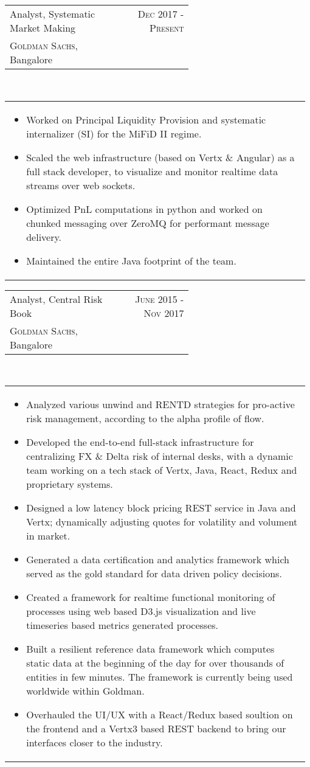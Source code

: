 \documentclass[a4paper]{article} %
\newcommand{\verticalspacing}{-0.25cm}
\newcommand{\bulletspace}{0.7cm}
\newcommand{\projectheadspacing}{6.9cm}
\newcommand{\cproject}[5]{%
    \begin{tabular}{p{0.60\linewidth}r}
        \textcolor{NavyBlue}{\small #2} & \multicolumn{1}{m{ \projectheadspacing{} }}{\raggedleft \small {\textsc{#1}}}\\
        \small {#3} & \small {#4}
    \end{tabular}\\
    \begin{tabular}{p{0.98\linewidth}}
    \vspace{-0.3cm}
        \small{#5}
    \end{tabular}
    \vspace{\verticalspacing{}}
}
\begin{document}
\cproject
      {Dec 2017 - Present}
      {Analyst, Systematic Market Making}
      {\textsc{Goldman Sachs}, Bangalore}
      {}
      {%
        \begin{itemize}[leftmargin=\bulletspace{}]
          \item Worked on Principal Liquidity Provision and systematic internalizer (SI) for the MiFiD II regime.
          \item Scaled the web infrastructure (based on Vertx \& Angular) as a full stack developer, to visualize
                and monitor realtime data streams over web sockets.
          \item Optimized PnL computations in python and worked on chunked messaging over ZeroMQ for performant
                message delivery.
          \item Maintained the entire Java footprint of the team.
        \end{itemize}
      }

\cproject
      {June 2015 - Nov 2017}
      {Analyst, Central Risk Book}
      {\textsc{Goldman Sachs}, Bangalore}
      {}
      {%
        \begin{itemize}[leftmargin=\bulletspace{}]
          \item Analyzed various unwind and RENTD strategies for pro-active risk management, according
                to the alpha profile of flow.
          \item Developed the end-to-end full-stack infrastructure for centralizing FX \& Delta risk of
                internal desks, with a dynamic team working on a tech stack of Vertx, Java, React, Redux
                and proprietary systems.
          \item Designed a low latency block pricing REST service in Java and Vertx; dynamically adjusting
                quotes for volatility and volument in market.
          \item Generated a data certification and analytics framework which served as the gold standard for
                data driven policy decisions.
          \item Created a framework for realtime functional monitoring of processes using web based
                D3.js visualization and live timeseries based metrics generated processes.
          \item Built a resilient reference data framework which computes static data at the beginning of
                the day for over thousands of entities in few minutes. The framework is currently being used
                worldwide within Goldman.
          \item Overhauled the UI/UX with a React/Redux based soultion on the frontend and a Vertx3 based REST
                backend to bring our interfaces closer to the industry.
        \end{itemize}
      }
\end{document}

